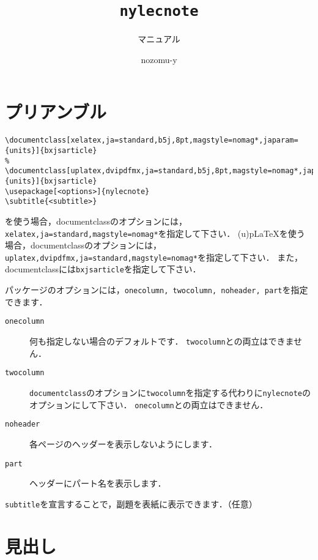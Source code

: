 \documentclass[xelatex,ja=standard,b5j,8pt,magstyle=nomag*,japaram={units}]{bxjsarticle}
\title{{\tt nylecnote}}
\subtitle{マニュアル}
\author{nozomu-y}
\begin{document}
\maketitle
\tableofcontents
\newpage

\section{プリアンブル}
\begin{lstlisting}
\documentclass[xelatex,ja=standard,b5j,8pt,magstyle=nomag*,japaram={units}]{bxjsarticle}
% \documentclass[uplatex,dvipdfmx,ja=standard,b5j,8pt,magstyle=nomag*,japaram={units}]{bxjsarticle}
\usepackage[<options>]{nylecnote}
\subtitle{<subtitle>}
\end{lstlisting}

\XeLaTeX を使う場合，documentclassのオプションには，{\tt xelatex,ja=standard,magstyle=nomag*}を指定して下さい．
(u)p\LaTeX を使う場合，documentclassのオプションには，{\tt uplatex,dvipdfmx,ja=standard,magstyle=nomag*}を指定して下さい．
また，documentclassには{\tt bxjsarticle}を指定して下さい．

パッケージのオプションには，{\tt onecolumn, twocolumn, noheader, part}を指定できます．
\begin{description}
    \item[{\tt onecolumn}] 何も指定しない場合のデフォルトです．
        {\tt twocolumn}との両立はできません．
    \item[{\tt twocolumn}] {\tt documentclass}のオプションに{\tt twocolumn}を指定する代わりに{\tt nylecnote}のオプションにして下さい．
        {\tt onecolumn}との両立はできません．
    \item[{\tt noheader}] 各ページのヘッダーを表示しないようにします．
    \item[{\tt part}] ヘッダーにパート名を表示します．
\end{description}

{\tt subtitle}を宣言することで，副題を表紙に表示できます．（任意）

\newpage
\section{見出し}
\end{document}
